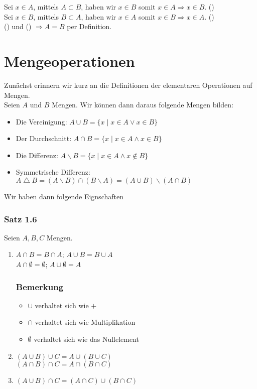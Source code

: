Sei $x\in A$, mittels $A\subset B$, haben wir $x\in B$ somit $x\in A \Rightarrow x\in B$. (\textasteriskcentered)\\

Sei $x\in B$, mittels $B\subset A$, haben wir $x\in A$ somit $x\in B \Rightarrow x\in A$. (\textasteriskcentered\textasteriskcentered)\\

(\textasteriskcentered) und (\textasteriskcentered\textasteriskcentered) $\Rightarrow A=B$ per Definition. 

\section{Mengeoperationen}
Zunächst erinnern wir kurz an die Definitionen der elementaren Operationen auf Mengen. \\

\noindent Seien $A$ und $B$ Mengen. Wir können dann daraus folgende Mengen bilden:

\begin{itemize}
\item Die Vereinigung: $A\cup B=\{x\mid x\in A \lor x\in B\}$
\item Der Durchschnitt: $A\cap B=\{x\mid x\in A \land x\in B\}$
\item Die Differenz: $A\backslash B=\{x\mid x\in A \land x\not\in B\}$
\item Symmetrische Differenz: $A\bigtriangleup B=\left(A\backslash B\right) \cap \left(B\backslash A\right)=\left(A\cup B\right)\backslash\left(A\cap B\right)$
\end{itemize}

Wir haben dann folgende Eignschaften
\subsubsection*{Satz 1.6}
Seien $A,B,C$ Mengen. 
\begin{enumerate}
\item $A\cap B=B\cap A$; $A\cup B=B\cup A$\\
$A\cap \emptyset=\emptyset$; $A\cup \emptyset=A$\vspace{-4mm}
\subsubsection*{Bemerkung}
\begin{itemize}
    \item $\cup$ verhaltet sich wie $+$
    \item $\cap$ verhaltet sich wie Multiplikation
    \item $\emptyset$ verhaltet sich wie das Nullelement
\end{itemize}
    \item $\left( A\cup B\right)\cup C=A\cup\left( B\cup C\right)$\\
    $\left( A\cap B\right)\cap C=A\cap\left( B\cap C\right)$
    \item $\left( A\cup B\right) \cap C=\left( A\cap C\right) \cup \left( B\cap C\right)$
\end{enumerate}



